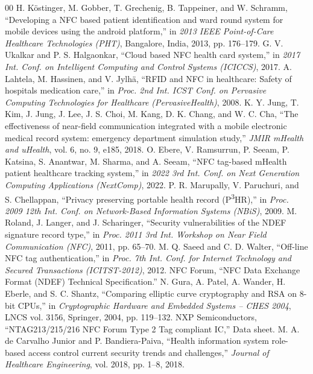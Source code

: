 \documentclass[conference]{IEEEtran}
\begin{document}
\begin{thebibliography}{00}
 H. K\"ostinger, M. Gobber, T. Grechenig, B. Tappeiner, and W. Schramm, ``Developing a NFC based patient identification and ward round system for mobile devices using the android platform,'' in \textit{2013 IEEE Point-of-Care Healthcare Technologies (PHT)}, Bangalore, India, 2013, pp. 176--179.
 G. V. Ukalkar and P. S. Halgaonkar, ``Cloud based NFC health card system,'' in \textit{2017 Int. Conf. on Intelligent Computing and Control Systems (ICICCS)}, 2017.
 A. Lahtela, M. Hassinen, and V. Jylh\"a, ``RFID and NFC in healthcare: Safety of hospitals medication care,'' in \textit{Proc. 2nd Int. ICST Conf. on Pervasive Computing Technologies for Healthcare (PervasiveHealth)}, 2008.
 K. Y. Jung, T. Kim, J. Jung, J. Lee, J. S. Choi, M. Kang, D. K. Chang, and W. C. Cha, ``The effectiveness of near-field communication integrated with a mobile electronic medical record system: emergency department simulation study,'' \textit{JMIR mHealth and uHealth}, vol. 6, no. 9, e185, 2018.
 O. Ebere, V. Ramsurrun, P. Seeam, P. Katsina, S. Anantwar, M. Sharma, and A. Seeam, ``NFC tag-based mHealth patient healthcare tracking system,'' in \textit{2022 3rd Int. Conf. on Next Generation Computing Applications (NextComp)}, 2022.
 P. R. Marupally, V. Paruchuri, and S. Chellappan, ``Privacy preserving portable health record (P\textsuperscript{3}HR),'' in \textit{Proc. 2009 12th Int. Conf. on Network-Based Information Systems (NBiS)}, 2009.
 M. Roland, J. Langer, and J. Scharinger, ``Security vulnerabilities of the NDEF signature record type,'' in \textit{Proc. 2011 3rd Int. Workshop on Near Field Communication (NFC)}, 2011, pp. 65--70.
 M. Q. Saeed and C. D. Walter, ``Off-line NFC tag authentication,'' in \textit{Proc. 7th Int. Conf. for Internet Technology and Secured Transactions (ICITST-2012)}, 2012.
 NFC Forum, ``NFC Data Exchange Format (NDEF) Technical Specification.''
 N. Gura, A. Patel, A. Wander, H. Eberle, and S. C. Shantz, ``Comparing elliptic curve cryptography and RSA on 8-bit CPUs,'' in \textit{Cryptographic Hardware and Embedded Systems -- CHES 2004}, LNCS vol. 3156, Springer, 2004, pp. 119--132.
 NXP Semiconductors, ``NTAG213/215/216 NFC Forum Type 2 Tag compliant IC,'' Data sheet.
 M. A. de Carvalho Junior and P. Bandiera-Paiva, ``Health information system role-based access control current security trends and challenges,'' \textit{Journal of Healthcare Engineering}, vol. 2018, pp. 1--8, 2018.

\end{thebibliography}
\end{document}
